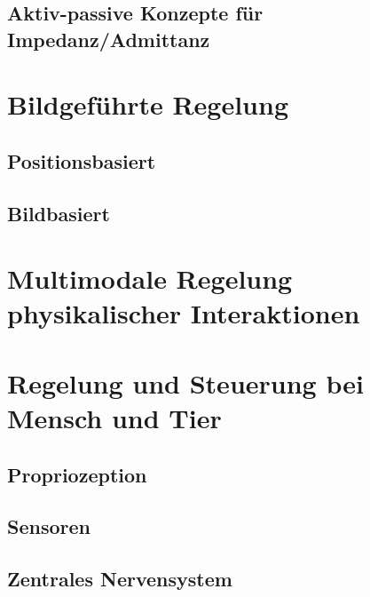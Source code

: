 \documentclass[a4paper, 11pt, accentcolor = tud3b]{tudreport}
\begin{document}
			\subsection{Aktiv-passive Konzepte für Impedanz/Admittanz} %

		\section{Bildgeführte Regelung} %

			\subsection{Positionsbasiert} %

			\subsection{Bildbasiert} %

		\section{Multimodale Regelung physikalischer Interaktionen} %

		\section{Regelung und Steuerung bei Mensch und Tier} %

			\subsection{Propriozeption} %

			\subsection{Sensoren} %

			\subsection{Zentrales Nervensystem} %
\end{document}
